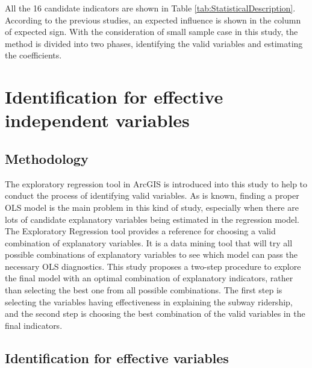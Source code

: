 \documentclass[utf8]{article}
\begin{document}
%
All the 16 candidate indicators are shown in Table \ref{tab:StatisticalDescription}. According to the previous studies, an expected influence is shown in the column of expected sign. With the consideration of small sample case in this study, the method is divided into two phases, identifying the valid variables and estimating the coefficients.

%
\section{Identification for effective independent variables}
\subsection{Methodology}
\indent

The exploratory regression tool in ArcGIS is introduced into this study to help to conduct the process of identifying valid variables. As is known, finding a proper OLS model is the main problem in this kind of study, especially when there are lots of candidate explanatory variables being estimated in the regression model. The Exploratory Regression tool provides a reference for choosing a valid combination of explanatory variables. It is a data mining tool that will try all possible combinations of explanatory variables to see which model can pass the necessary OLS diagnostics. This study proposes a two-step procedure to explore the final model with an optimal combination of explanatory indicators, rather than selecting the best one from all possible combinations. The first step is selecting the variables having effectiveness in explaining the subway ridership, and the second step is choosing the best combination of the valid variables in the final indicators.

%
\subsection{Identification for effective variables}
\indent
\end{document}
